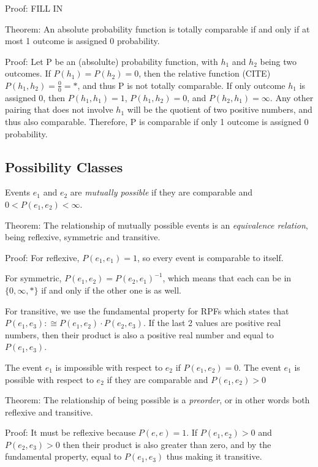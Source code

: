 \documentclass[twoside]{article}
\begin{document}
Proof: FILL IN

Theorem: An absolute probability function is totally comparable if and only if at most 1 outcome is assigned 0 probability.

Proof: Let P be an (absolulte) probability function, with \(h_1\) and \(h_2\) being two outcomes. If \(P(h_1) = P(h_2) = 0\), then the relative function (CITE) \(P(h_1, h_2) = \frac{0}{0} = \ast\), and thus P is not totally comparable. If only outcome \(h_1\) is assigned 0, then \(P(h_1, h_1) = 1\), \(P(h_1, h_2) = 0\), and \(P(h_2, h_1) = \infty\). Any other pairing that does not involve \(h_1\) will be the quotient of two positive numbers, and thus also comparable. Therefore, P is comparable if only 1 outcome is assigned 0 probability.

\subsection{Possibility Classes}

Events \(e_1\) and \(e_2\) are \textit{mutually possible} if they are comparable and \(0 < P(e_1, e_2) < \infty\).

Theorem: The relationship of mutually possible events is an \textit{equivalence relation}, being reflexive, symmetric and transitive.

Proof: For reflexive, \(P(e_1, e_1) = 1\), so every event is comparable to itself.

For symmetric, \(P(e_1, e_2) = P(e_2, e_1)^{-1}\), which means that each can be in \(\{0, \infty, \ast\}\) if and only if the other one is as well.

For transitive, we use the fundamental property for RPFs which states that \(P(e_1, e_3) :\cong P(e_1, e_2) \cdot P(e_2, e_3)\). If the last 2 values are positive real numbers, then their product is also a positive real number and equal to \(P(e_1, e_3)\).

The event \(e_1\) is impossible with respect to \(e_2\) if \(P(e_1, e_2) = 0\). The event \(e_1\) is possible with respect to \(e_2\) if they are comparable and \(P(e_1, e_2) > 0\)

Theorem: The relationship of being possible is a \textit{preorder}, or in other words both reflexive and transitive.

Proof: It must be reflexive because \(P(e, e) = 1\). If \(P(e_1, e_2) > 0\) and \(P(e_2, e_3) > 0\) then their product is also greater than zero, and by the fundamental property, equal to \(P(e_1, e_3)\) thus making it transitive.
\end{document}
